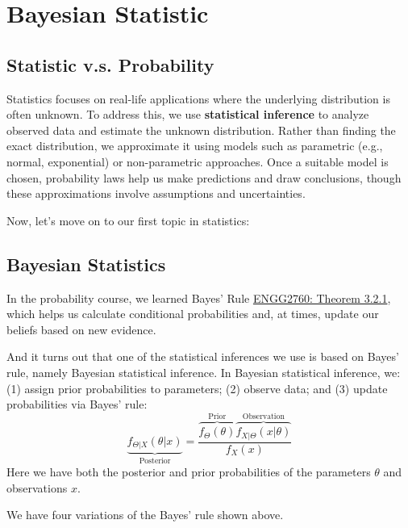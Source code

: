 \chapter{Bayesian Statistic}

\section{Statistic v.s. Probability}
Statistics focuses on real-life applications where the underlying distribution is often unknown. To address this, we use \textbf{statistical inference} to analyze observed data and estimate the unknown distribution. Rather than finding the exact distribution, we approximate it using models such as parametric (e.g., normal, exponential) or non-parametric approaches. Once a suitable model is chosen, probability laws help us make predictions and draw conclusions, though these approximations involve assumptions and uncertainties.  

Now, let's move on to our first topic in statistics: 

\section{Bayesian Statistics}
In the probability course, we learned Bayes' Rule \href{https://ryanc.wtf/files/ENGG2760.pdf#page=14}{ENGG2760: Theorem 3.2.1}, which helps us calculate conditional probabilities and, at times, update our beliefs based on new evidence.

And it turns out that one of the statistical inferences we use is based on Bayes' rule, namely Bayesian statistical inference. In Bayesian statistical inference, we: (1) assign prior probabilities to parameters; (2) observe data; and (3) update probabilities via Bayes' rule:
\[
  \underbrace{f_{\Theta \vert X} (\theta \vert x)}_{\text{Posterior}} = \dfrac{\overbrace{f_{\Theta} (\theta)}^{\text{Prior}} \overbrace{f_{X \vert \Theta} (x \vert \theta)}^{\text{Observation}}}{f_X (x)}
\]
Here we have both the posterior and prior probabilities of the parameters \(\theta\)  and observations \(x\).  

We have four variations of the Bayes' rule shown above.

